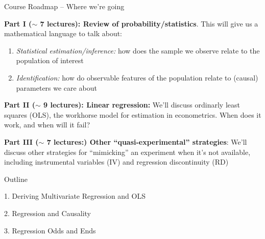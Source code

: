 \documentclass[11pt,handout,aspectratio=169]{beamer}
\newenvironment{wideitemize}{\itemize\addtolength{\itemsep}{10pt}}{\enditemize}
\begin{document}
\begin{frame}{Course Roadmap -- Where we're going}
	\begin{wideitemize}
		\item
		\textbf{Part I ($\sim$ 7 lectures): Review of probability/statistics}. This will give us a mathematical language to talk about:
		
			\begin{enumerate}
				\item 
				\textit{Statistical estimation/inference: }how does the sample we observe relate to the population of interest
				
				\item
				\textit{Identification:} how do observable features of the population relate to (causal) parameters we care about
			\end{enumerate}
		\pause 
		
		\item
		\textbf{Part II ($\sim$ 9 lectures): Linear regression: } We'll discuss ordinarly least squares (OLS), the workhorse model for estimation in econometrics. When does it work, and when will it fail?
		
		\pause
		\item
		\textbf{Part III ($\sim$ 7 lectures:) Other ``quasi-experimental'' strategies}: We'll discuss other strategies for ``mimicking'' an experiment when it's not available, including instrumental variables (IV) and regression discontinuity (RD)
			 
	\end{wideitemize}
\end{frame}

	
	
	\begin{frame}{Outline}

	1. Deriving Multivariate Regression and OLS
	\vspace{0.8cm}
	
	2. Regression and Causality
	\vspace{0.8cm}
	
	3. Regression Odds and Ends
	
	\end{frame}
		
\end{document}
